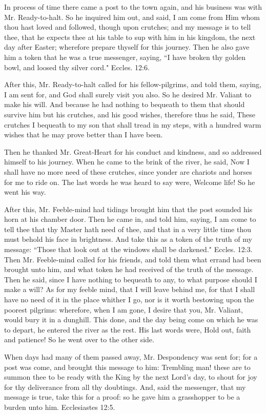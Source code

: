 In process of time there came a post to the town again, and his business was with Mr. Ready-to-halt. So he inquired him out, and said, I am come from Him whom thou hast loved and followed, though upon crutches; and my message is to tell thee, that he expects thee at his table to sup with him in his kingdom, the next day after Easter; wherefore prepare thyself for this journey. Then he also gave him a token that he was a true messenger, saying, ``I have broken thy golden bowl, and loosed thy silver cord." Eccles. 12:6.

After this, Mr. Ready-to-halt called for his fellow-pilgrims, and told them, saying, I am sent for, and God shall surely visit you also. So he desired Mr. Valiant to make his will. And because he had nothing to bequeath to them that should survive him but his crutches, and his good wishes, therefore thus he said, These crutches I bequeath to my son that shall tread in my steps, with a hundred warm wishes that he may prove better than I have been.

Then he thanked Mr. Great-Heart for his conduct and kindness, and so addressed himself to his journey. When he came to the brink of the river, he said, Now I shall have no more need of these crutches, since yonder are chariots and horses for me to ride on. The last words he was heard to say were, Welcome life! So he went his way.

After this, Mr. Feeble-mind had tidings brought him that the post sounded his horn at his chamber door. Then he came in, and told him, saying, I am come to tell thee that thy Master hath need of thee, and that in a very little time thou must behold his face in brightness. And take this as a token of the truth of my message: ``Those that look out at the windows shall be darkened." Eccles. 12:3. Then Mr. Feeble-mind called for his friends, and told them what errand had been brought unto him, and what token he had received of the truth of the message. Then he said, since I have nothing to bequeath to any, to what purpose should I make a will? As for my feeble mind, that I will leave behind me, for that I shall have no need of it in the place whither I go, nor is it worth bestowing upon the poorest pilgrims: wherefore, when I am gone, I desire that you, Mr. Valiant, would bury it in a dunghill. This done, and the day being come on which he was to depart, he entered the river as the rest. His last words were, Hold out, faith and patience! So he went over to the other side.

When days had many of them passed away, Mr. Despondency was sent for; for a post was come, and brought this message to him: Trembling man! these are to summon thee to be ready with the King by the next Lord's day, to shout for joy for thy deliverance from all thy doubtings. And, said the messenger, that my message is true, take this for a proof: so he gave him a grasshopper to be a burden unto him. Ecclesiastes 12:5.

